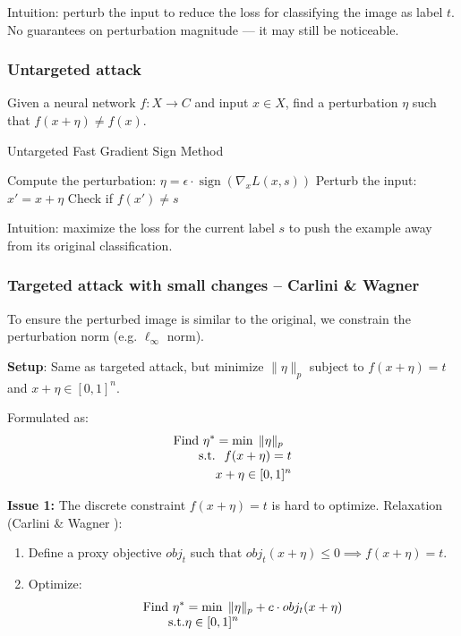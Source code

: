 \documentclass[11pt]{article}
\begin{document}
\begin{note}
	Intuition: perturb the input to reduce the loss for classifying the image as label $t$. No guarantees on perturbation magnitude — it may still be noticeable.
\end{note}

\subsubsection{Untargeted attack}
Given a neural network $f: X \to C$ and input $x \in X$, find a perturbation $\eta$ such that $f(x + \eta) \neq f(x)$.

\begin{algorithm}
\caption{Untargeted Fast Gradient Sign Method}
\begin{algorithmic}[1]
\State Compute the perturbation: $\eta = \epsilon \cdot \operatorname{sign}(\nabla_x L(x, s))$ 
\State Perturb the input: $x' = x + \eta$
\State Check if $f(x') \neq s$ 
\end{algorithmic}
\end{algorithm}

\begin{note}
	Intuition: maximize the loss for the current label $s$ to push the example away from its original classification.
\end{note}

\subsubsection{Targeted attack with small changes – Carlini \& Wagner}
To ensure the perturbed image is similar to the original, we constrain the perturbation norm (e.g. $\ell_\infty$ norm).

\textbf{Setup}: Same as targeted attack, but minimize $\|\eta\|_p$ subject to $f(x+\eta) = t$ and $x + \eta \in [0,1]^n$.

Formulated as:
\[
  \optprob{Find $\eta^*$}{\min}{\|\eta\|_p}[%
    f(x+\eta) = t \\ x + \eta \in [0, 1]^n
  ]
\]

\textbf{Issue 1:} The discrete constraint $f(x+\eta) = t$ is hard to optimize. Relaxation (Carlini \& Wagner \cite{carlini2017towards}):
\begin{enumerate}
	\item Define a proxy objective $obj_t$ such that $obj_t(x+\eta) \leq 0 \implies f(x+\eta) = t$.
	\item Optimize:
	\[
	  \optprob{Find $\eta^*$}{\min}{\|\eta\|_p + c \cdot obj_t(x+\eta)}[%
	    \eta \in [0, 1]^n
	  ]
	\]
\end{enumerate} 
\end{document}
